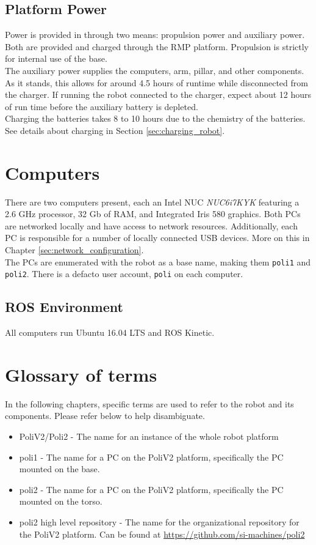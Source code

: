 \subsection{Platform Power}
Power is provided in through two means: propulsion power and auxiliary power. 
Both are provided and charged through the RMP platform. Propulsion is strictly for internal use of the base. \\

The auxiliary power supplies the computers, arm, pillar, and other components. 
As it stands, this allows for around 4.5 hours of runtime while disconnected from the charger. 
If running the robot connected to the charger, expect about 12 hours of run time before the auxiliary battery is depleted. \\

Charging the batteries takes 8 to 10 hours due to the chemistry of the batteries. 
See details about charging in Section \ref{sec:charging_robot}.


\section{Computers}
There are two computers present, each an Intel NUC \textit{NUC6i7KYK} featuring a 2.6 GHz processor, 32 Gb of RAM, and Integrated Iris 580 graphics. 
Both PCs are networked locally and have access to network resources. 
Additionally, each PC is responsible for a number of locally connected USB devices. 
More on this in Chapter \ref{sec:network_configuration}.\\

The PCs are enumerated with the robot as a base name, making them \texttt{poli1} and \texttt{poli2}. 
There is a defacto user account, \texttt{poli} on each computer.

\subsection{ROS Environment}
All computers run Ubuntu 16.04 LTS and ROS Kinetic.

\section{Glossary of terms}
In the following chapters, specific terms are used to refer to the robot and its components. 
Please refer below to help disambiguate.

\begin{itemize}
\item PoliV2/Poli2 - The name for an instance of the whole robot platform
\item poli1 - The name for a PC on the PoliV2 platform, specifically the PC mounted on the base.
\item poli2 - The name for a PC on the PoliV2 platform, specifically the PC mounted on the torso.
\item poli2 high level repository - The name for the organizational repository for the PoliV2 platform. Can be found at \href{https://github.com/si-machines/poli2}{https://github.com/si-machines/poli2}
\end{itemize}

